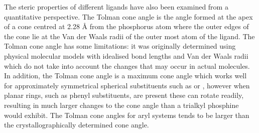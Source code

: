 
The steric properties of different ligands have also been examined from a quantitative perspective.  The Tolman cone angle is the angle formed at the apex of a cone centred at 2.28 \si{\angstrom} from the phosphorus atom where the outer edges of the cone lie at the Van der Waals radii of the outer most atom of the ligand.  The Tolman cone angle has some limitations: it was originally determined using physical molecular models with idealised bond lengths and Van der Waals radii which do not take into account the changes that may occur in actual molecules.  In addition, the Tolman cone angle is a maximum cone angle which works well for approximately symmetrical spherical substituents such as  or , however when planar rings, such as phenyl substituents, are present these can rotate readily, resulting in much larger changes to the cone angle than a trialkyl phosphine would exhibit.  The Tolman cone angles for aryl systems tends to be larger than the crystallographically determined cone angle.

